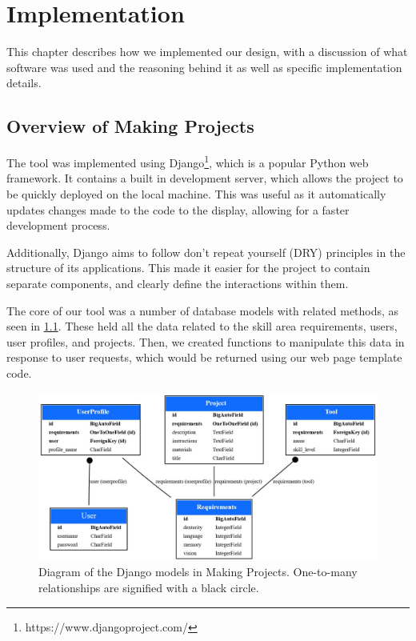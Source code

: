 \documentclass{l4proj}
\begin{document}
\chapter{Implementation}
\label{implementation}
This chapter describes how we implemented our design, with a discussion of what software was used and the reasoning behind it as well as specific implementation details. 


\section{Overview of Making Projects}
The tool was implemented using Django\footnote{https://www.djangoproject.com/}, which is a popular Python web framework. It contains a built in development server, which allows the project to be quickly deployed on the local machine. This was useful as it automatically updates changes made to the code to the display, allowing for a faster development process. 

Additionally, Django aims to follow don't repeat yourself (DRY) principles in the structure of its applications. This made it easier for the project to contain separate components, and clearly define the interactions within them. 

The core of our tool was a number of database models with related methods, as seen in \ref{fig:model_fig}. These held all the data related to the skill area requirements, users, user profiles, and projects. Then, we created functions to manipulate this data in response to user requests, which would be returned using our web page template code. 

\begin{figure}[htb]
    \centering
    \includegraphics[width=\linewidth]{images/model.jpg}    

    \caption{Diagram of the Django models in Making Projects. One-to-many relationships are signified with a black circle. 
    }
    \label{fig:model_fig} 
\end{figure}
\end{document}
